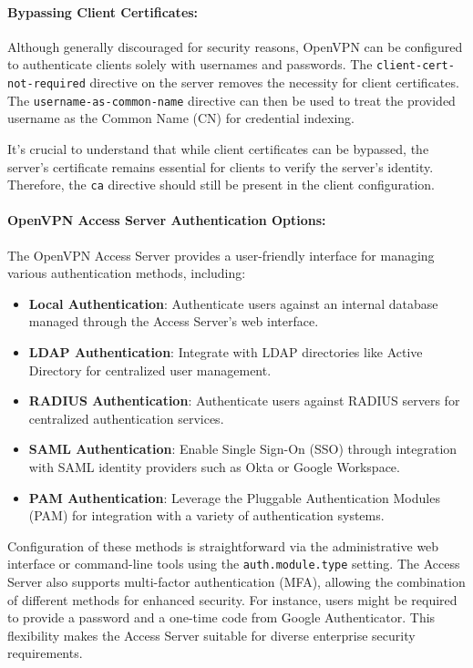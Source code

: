 \paragraph{Bypassing Client Certificates:}
Although generally discouraged for security reasons, OpenVPN can be configured to authenticate clients solely with usernames and passwords. The \texttt{client-cert-not-required} directive on the server removes the necessity for client certificates. The \texttt{username-as-common-name} directive can then be used to treat the provided username as the Common Name (CN) for credential indexing.

It's crucial to understand that while client certificates can be bypassed, the server's certificate remains essential for clients to verify the server's identity. Therefore, the \texttt{ca} directive should still be present in the client configuration.

\paragraph{OpenVPN Access Server Authentication Options:}
The OpenVPN Access Server provides a user-friendly interface for managing various authentication methods, including:

\begin{itemize}
\item \textbf{Local Authentication}: Authenticate users against an internal database managed through the Access Server's web interface.
\item \textbf{LDAP Authentication}: Integrate with LDAP directories like Active Directory for centralized user management.
\item \textbf{RADIUS Authentication}: Authenticate users against RADIUS servers for centralized authentication services.
\item \textbf{SAML Authentication}: Enable Single Sign-On (SSO) through integration with SAML identity providers such as Okta or Google Workspace.
\item \textbf{PAM Authentication}: Leverage the Pluggable Authentication Modules (PAM) for integration with a variety of authentication systems.
\end{itemize}

Configuration of these methods is straightforward via the administrative web interface or command-line tools using the \texttt{auth.module.type} setting. The Access Server also supports multi-factor authentication (MFA), allowing the combination of different methods for enhanced security. For instance, users might be required to provide a password and a one-time code from Google Authenticator. This flexibility makes the Access Server suitable for diverse enterprise security requirements.

